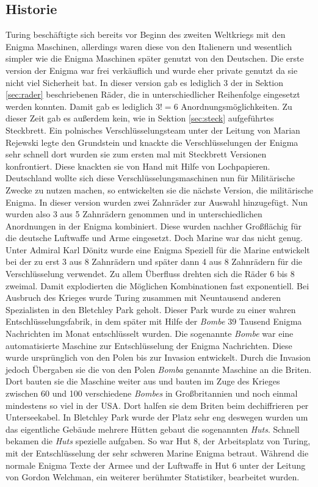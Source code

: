 \subsection{Historie}
Turing beschäftigte sich bereits vor Beginn des zweiten Weltkriegs mit den Enigma Maschinen, allerdings waren diese von den Italienern und wesentlich simpler wie die Enigma Maschinen später genutzt von den Deutschen. Die erste version der Enigma war frei verkäuflich und wurde eher private genutzt da sie nicht viel Sicherheit bat. In dieser version gab es lediglich 3 der in Sektion \ref{sec:rader} beschriebenen Räder, die in unterschiedlicher Reihenfolge eingesetzt werden konnten. Damit gab es lediglich $3! = 6$ Anordnungsmöglichkeiten. Zu dieser Zeit gab es außerdem kein, wie in Sektion \ref{sec:steck} aufgeführtes Steckbrett. Ein polnisches Verschlüsselungsteam unter der Leitung von Marian Rejewski legte den Grundstein und knackte die Verschlüsselungen der Enigma sehr schnell dort wurden sie zum ersten mal mit Steckbrett Versionen konfrontiert. Diese knackten sie von Hand mit Hilfe von Lochpapieren. Deutschland wollte sich diese Verschlüsselungsmaschinen nun für Militärische Zwecke zu nutzen machen, so entwickelten sie die nächste Version, die militärische Enigma. In dieser version wurden zwei Zahnräder zur Auswahl hinzugefügt. Nun wurden also 3 aus 5 Zahnrädern genommen und in unterschiedlichen Anordnungen in der Enigma kombiniert. Diese wurden nachher Großflächig für die deutsche Luftwaffe und Arme eingesetzt. Doch Marine war das nicht genug. Unter Admiral Karl Dönitz wurde eine Enigma Speziell für die Marine entwickelt bei der zu erst 3 aus 8 Zahnrädern und später dann 4 aus 8 Zahnrädern für die Verschlüsselung verwendet. Zu allem Überfluss drehten sich die Räder 6 bis 8 zweimal. Damit explodierten die Möglichen Kombinationen fast exponentiell. Bei Ausbruch des Krieges wurde Turing zusammen mit Neuntausend anderen Spezialisten in den Bletchley Park geholt. Dieser Park wurde zu einer wahren Entschlüsselungsfabrik, in dem später mit Hilfe der \emph{Bombe} 39 Tausend Enigma Nachrichten im Monat entschlüsselt wurden. Die sogenannte \emph{Bombe} war eine automatisierte Maschine zur Entschlüsselung der Enigma Nachrichten. Diese wurde ursprünglich von den Polen bis zur Invasion entwickelt. Durch die Invasion jedoch Übergaben sie die von den Polen \emph{Bomba} genannte Maschine an die Briten. Dort bauten sie die Maschine weiter aus und bauten im Zuge des Krieges zwischen 60 und 100 verschiedene \emph{Bombes} in Großbritannien und noch einmal mindestens so viel in der USA. Dort halfen sie dem Briten beim dechiffrieren per Unterseekabel. In Bletchley Park wurde der Platz sehr eng deswegen wurden um das eigentliche Gebäude mehrere Hütten gebaut die sogenannten \emph{Huts}. Schnell bekamen die \emph{Huts} spezielle aufgaben. So war Hut 8, der Arbeitsplatz von Turing, mit der Entschlüsselung der sehr schweren Marine Enigma betraut. Während die normale Enigma Texte der Armee und der Luftwaffe in Hut 6 unter der Leitung von Gordon Welchman, ein weiterer berühmter Statistiker, bearbeitet wurden.  \cite{enigmaproblem1} \cite{theessentialturing}

